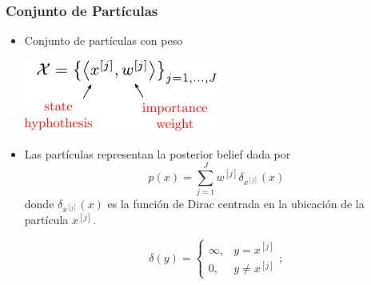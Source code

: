 \begin{frame}
    \frametitle{Conjunto de Partículas}
    
    \begin{itemize}
        \item Conjunto de partículas con peso
            
        \begin{center}
            \includegraphics[width=0.5\columnwidth]{./images/particle_filter/weighted_samples.pdf}
        \end{center}

        \item Las partículas representan la posterior belief dada por
        \begin{equation*}
            p(x) = \sum_{j=1}^{J} w^{[j]} \delta_{x^{[j]}}(x)    
        \end{equation*}
        donde $\delta_{x^{[j]}}(x)$ es la función de Dirac centrada en la ubicación de la partícula $x^{[j]}$.

        \begin{equation*}
            \delta(y) = 
            \begin{cases} 
            \infty, & y = x^{[j]} \\ 
            0, & y \neq x^{[j]} 
            \end{cases};    
        \end{equation*}


    \end{itemize}
   
\end{frame}


